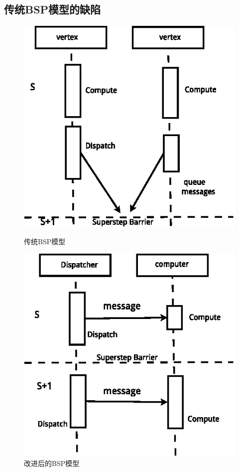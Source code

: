 \subsection{传统BSP模型的缺陷}
\begin{figure}[htbp]
\centering
\begin{minipage}{0.4\textwidth}
\centering
\includegraphics[width=\textwidth]{myfigures/sequentialbsp_new}
\caption{传统BSP模型}\label{fig:traBSP}
\end{minipage}
\begin{minipage}{0.4\textwidth}
\centering
\includegraphics[width=\textwidth]{myfigures/computemodel}
\caption{改进后的BSP模型}\label{fig:newBSP}
\end{minipage}
\vspace{\baselineskip}
\end{figure}

